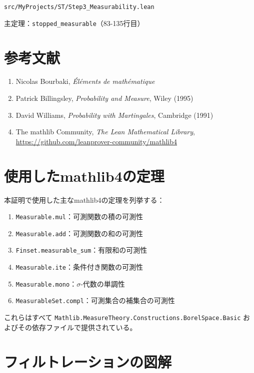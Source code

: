 \documentclass[a4paper,12pt]{ltjsarticle}
\theoremstyle{definition}
\begin{document}
\begin{tcolorbox}[colback=gray!10, colframe=black, title=Lean 4コードへのリンク]
\texttt{src/MyProjects/ST/Step3\_Measurability.lean}

主定理：\texttt{stopped\_measurable}（83-135行目）
\end{tcolorbox}

\section*{参考文献}

\begin{enumerate}
\item Nicolas Bourbaki, \textit{Éléments de mathématique}
\item Patrick Billingsley, \textit{Probability and Measure}, Wiley (1995)
\item David Williams, \textit{Probability with Martingales}, Cambridge (1991)
\item The mathlib Community, \textit{The Lean Mathematical Library}, \url{https://github.com/leanprover-community/mathlib4}
\end{enumerate}

\appendix

\section{使用したmathlib4の定理}

本証明で使用した主なmathlib4の定理を列挙する：

\begin{enumerate}
\item \texttt{Measurable.mul}：可測関数の積の可測性
\item \texttt{Measurable.add}：可測関数の和の可測性
\item \texttt{Finset.measurable\_sum}：有限和の可測性
\item \texttt{Measurable.ite}：条件付き関数の可測性
\item \texttt{Measurable.mono}：$\sigma$-代数の単調性
\item \texttt{MeasurableSet.compl}：可測集合の補集合の可測性
\end{enumerate}

これらはすべて \texttt{Mathlib.MeasureTheory.Constructions.BorelSpace.Basic} およびその依存ファイルで提供されている。

\section{フィルトレーションの図解}
\end{document}
